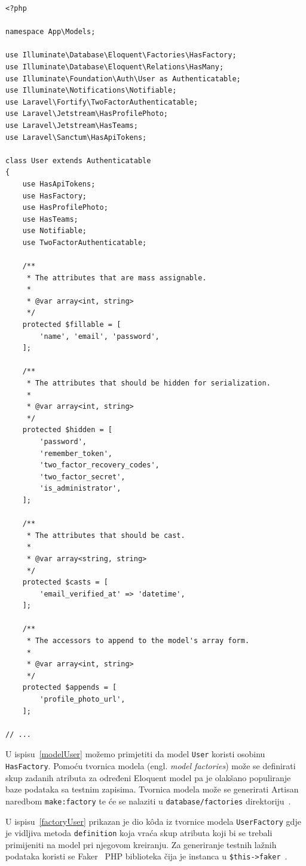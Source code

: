 \begin{lstlisting}[caption={Dio k\^oda model klase \texttt{User}}, label=modelUser]
<?php

namespace App\Models;

use Illuminate\Database\Eloquent\Factories\HasFactory;
use Illuminate\Database\Eloquent\Relations\HasMany;
use Illuminate\Foundation\Auth\User as Authenticatable;
use Illuminate\Notifications\Notifiable;
use Laravel\Fortify\TwoFactorAuthenticatable;
use Laravel\Jetstream\HasProfilePhoto;
use Laravel\Jetstream\HasTeams;
use Laravel\Sanctum\HasApiTokens;

class User extends Authenticatable
{
    use HasApiTokens;
    use HasFactory;
    use HasProfilePhoto;
    use HasTeams;
    use Notifiable;
    use TwoFactorAuthenticatable;

    /**
     * The attributes that are mass assignable.
     *
     * @var array<int, string>
     */
    protected $fillable = [
        'name', 'email', 'password',
    ];

    /**
     * The attributes that should be hidden for serialization.
     *
     * @var array<int, string>
     */
    protected $hidden = [
        'password',
        'remember_token',
        'two_factor_recovery_codes',
        'two_factor_secret',
        'is_administrator',
    ];

    /**
     * The attributes that should be cast.
     *
     * @var array<string, string>
     */
    protected $casts = [
        'email_verified_at' => 'datetime',
    ];

    /**
     * The accessors to append to the model's array form.
     *
     * @var array<int, string>
     */
    protected $appends = [
        'profile_photo_url',
    ];
    
// ...
\end{lstlisting}

U ispisu~\ref{modelUser} možemo primjetiti da model \texttt{User} koristi osobinu \texttt{HasFactory}. Pomoću tvornica modela (engl. \textit{model factories}) može se definirati skup zadanih atributa za određeni Eloquent model pa je olakšano populiranje baze podataka sa testnim zapisima. Tvornica modela može se generirati Artisan naredbom \texttt{make:factory} te će se nalaziti u \texttt{database/factories} direktoriju~\cite{factories}.

U ispisu~\ref{factoryUser} prikazan je dio k\^oda iz tvornice modela \texttt{UserFactory} gdje je vidljiva metoda \texttt{definition} koja vraća skup atributa koji bi se trebali primijeniti na model pri njegovom kreiranju. Za generiranje testnih lažnih podataka koristi se Faker~\cite{fakerGitHub} PHP biblioteka čija je instanca u \texttt{\$this->faker}~\cite{factories}.

